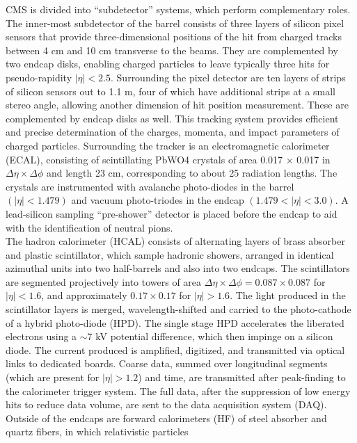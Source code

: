 CMS is divided into ``subdetector'' systems, which perform complementary roles.
The inner-most subdetector of the barrel consists of three layers of silicon pixel sensors 
that provide three-dimensional positions of the hit from charged tracks between 4 cm and
10 cm transverse to the beams. They are complemented by two endcap disks, enabling
charged particles to leave typically three hits for pseudo-rapidity $|\eta| < 2.5$. 
Surrounding the pixel detector are ten layers of strips of silicon sensors out to 1.1 m, 
four of which have additional strips at a small stereo angle, allowing another dimension of
hit position measurement. These are complemented by endcap disks as well. This
tracking system provides efficient and precise determination of the charges, momenta,
and impact parameters of charged particles. Surrounding the tracker is an electromagnetic 
calorimeter (ECAL), consisting of scintillating PbWO4 crystals of area 0.017 $\times$ 0.017 
in $\Delta\eta \times \Delta\phi$ and length 23 cm, corresponding to about 25 radiation lengths. 
The crystals are instrumented with avalanche photo-diodes in the barrel $(|\eta| < 1.479)$ 
and vacuum photo-triodes in the endcap $(1.479 < |\eta| < 3.0)$. A lead-silicon 
sampling ``pre-shower'' detector is placed before the endcap to aid with the identification 
of neutral pions.\\
\indent The hadron calorimeter (HCAL) consists of alternating layers of brass absorber
and plastic scintillator, which sample hadronic showers, arranged in identical azimuthal units 
into two half-barrels and also into two endcaps. The scintillators are segmented projectively 
into towers of area $\Delta\eta \times \Delta\phi = 0.087 \times 0.087$ for $|\eta| < 1.6$, and 
approximately $0.17 \times 0.17$ for $|\eta| > 1.6$. The light produced in the 
scintillator layers is merged, wavelength-shifted and carried to the photo-cathode 
of a hybrid photo-diode (HPD). The single stage HPD accelerates the liberated electrons 
using a $\sim$7 kV potential difference, which then impinge on a silicon diode. 
The current produced is amplified, digitized, and transmitted via optical links to 
dedicated boards. Coarse data, summed over longitudinal segments (which are present 
for $|\eta| > 1.2$) and time, are transmitted after peak-finding to the calorimeter 
trigger system. The full data, after the suppression of low energy hits to reduce data 
volume, are sent to the data acquisition system (DAQ).\\
\indent Outside of the endcaps are forward 
calorimeters (HF) of steel absorber and quartz fibers, in which relativistic particles 
